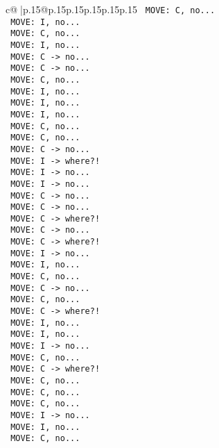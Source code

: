 \documentclass{article}
\begin{document}
{\begin{supertabular}{c@{$\;$}|p{.15\linewidth}@{}p{.15\linewidth}p{.15\linewidth}p{.15\linewidth}p{.15\linewidth}p{.15\linewidth}}
{{{\texttt{ MOVE: C, no...} \\
\texttt{ MOVE: I, no...} \\
\texttt{ MOVE: C, no...} \\
\texttt{ MOVE: I, no...} \\
\texttt{ MOVE: C {-}> no...} \\
\texttt{ MOVE: C {-}> no...} \\
\texttt{ MOVE: C, no...} \\
\texttt{ MOVE: I, no...} \\
\texttt{ MOVE: I, no...} \\
\texttt{ MOVE: I, no...} \\
\texttt{ MOVE: C, no...} \\
\texttt{ MOVE: C, no...} \\
\texttt{ MOVE: C {-}> no...} \\
\texttt{ MOVE: I {-}> where?!} \\
\texttt{ MOVE: I {-}> no...} \\
\texttt{ MOVE: I {-}> no...} \\
\texttt{ MOVE: C {-}> no...} \\
\texttt{ MOVE: C {-}> no...} \\
\texttt{ MOVE: C {-}> where?!} \\
\texttt{ MOVE: C {-}> no...} \\
\texttt{ MOVE: C {-}> where?!} \\
\texttt{ MOVE: I {-}> no...} \\
\texttt{ MOVE: I, no...} \\
\texttt{ MOVE: C, no...} \\
\texttt{ MOVE: C {-}> no...} \\
\texttt{ MOVE: C, no...} \\
\texttt{ MOVE: C {-}> where?!} \\
\texttt{ MOVE: I, no...} \\
\texttt{ MOVE: I, no...} \\
\texttt{ MOVE: I {-}> no...} \\
\texttt{ MOVE: C, no...} \\
\texttt{ MOVE: C {-}> where?!} \\
\texttt{ MOVE: C, no...} \\
\texttt{ MOVE: C, no...} \\
\texttt{ MOVE: C, no...} \\
\texttt{ MOVE: I {-}> no...} \\
\texttt{ MOVE: I, no...} \\
\texttt{ MOVE: C, no...} \\
}}}
\end{supertabular}}
\end{document}
